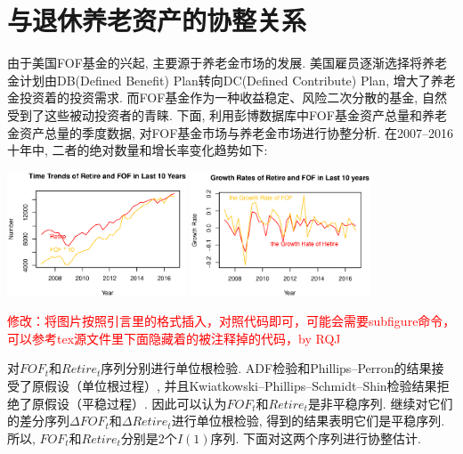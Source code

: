 \section{与退休养老资产的协整关系}
由于美国FOF基金的兴起, 主要源于养老金市场的发展. 美国雇员逐渐选择将养老金计划由DB(Defined Benefit) Plan转向DC(Defined Contribute) Plan, 增大了养老金投资着的投资需求. 而FOF基金作为一种收益稳定、风险二次分散的基金, 自然受到了这些被动投资者的青睐. 下面, 利用彭博数据库中FOF基金资产总量和养老金资产总量的季度数据, 对FOF基金市场与养老金市场进行协整分析. 在2007--2016十年中, 二者的绝对数量和增长率变化趋势如下:

\includegraphics[width=0.4\textwidth]{pic/3-0-1.eps}
\includegraphics[width=0.4\textwidth]{pic/3-0-2.eps}

\textcolor{red}{修改：将图片按照引言里的格式插入，对照代码即可，可能会需要subfigure命令，可以参考tex源文件里下面隐藏着的被注释掉的代码，by RQJ}


对${FOF_t}$和${Retire_t}$序列分别进行单位根检验. ADF检验和Phillips–Perron的结果接受了原假设（单位根过程）, 并且Kwiatkowski–Phillips–Schmidt–Shin检验结果拒绝了原假设（平稳过程）. 因此可以认为${FOF_t}$和${Retire_t}$是非平稳序列.
继续对它们的差分序列${\Delta FOF_t}$和${\Delta Retire_t}$进行单位根检验, 得到的结果表明它们是平稳序列. 所以, ${FOF_t}$和${Retire_t}$分别是2个$I(1)$序列. 下面对这两个序列进行协整估计.

